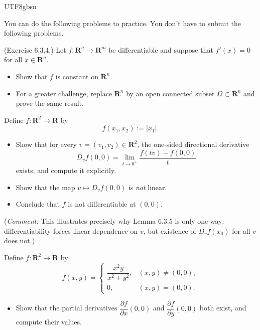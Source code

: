 \documentclass[addpoints]{exam}
\theoremstyle{definition}
\begin{document}
\begin{CJK*}{UTF8}{gbsn}
\begin{questions}
\end{questions}

You can do the following problems to practice. You don't have to submit the following problems.

\begin{questions}

\question   (Exercise 6.3.4.)
Let $f : \mathbf{R}^n \to \mathbf{R}^m$ be differentiable and suppose that
$f'(x) = 0$ for all $x \in \mathbf{R}^n$.

\begin{itemize}
\item[(a)] Show that $f$ is constant on $\mathbf{R}^n$.
\item[(b)] For a greater challenge, replace $\mathbf{R}^n$ by an open connected subset
$\Omega \subset \mathbf{R}^n$ and prove the same result.
\end{itemize}


\begin{solution}

\end{solution}
\medskip

\question  Define $f:\mathbf{R}^2\to \mathbf{R}$ by
\[
f(x_1,x_2):=|x_1|.
\]
\begin{itemize}
\item[(a)] Show that for every $v=(v_1,v_2)\in \mathbf{R}^2$, the one-sided directional derivative
\[
D_v f(0,0)=\lim_{t\to 0^+}\frac{f(tv)-f(0,0)}{t}
\]
exists, and compute it explicitly.
\item[(b)] Show that the map $v\mapsto D_v f(0,0)$ is \emph{not} linear.
\item[(c)] Conclude that $f$ is not differentiable at $(0,0)$.
\end{itemize}
(\emph{Comment:} This illustrates precisely why Lemma 6.3.5 is only one-way: differentiability forces linear dependence on $v$, but existence of $D_v f(x_0)$ for all $v$ does not.)

\begin{solution}

\end{solution}

\medskip

\question  Define $f:\mathbf{R}^2\to \mathbf{R}$ by
\[
f(x,y)=
\begin{cases}
\dfrac{x^2y}{x^2+y^2}, & (x,y)\neq (0,0),\\[0.6em]
0, & (x,y)=(0,0).
\end{cases}
\]

\begin{itemize}
\item[(a)] Show that the partial derivatives $\dfrac{\partial f}{\partial x}(0,0)$ and
$\dfrac{\partial f}{\partial y}(0,0)$ both exist, and compute their values.


\end{itemize}
\end{questions}
\end{CJK*}
\end{document}
